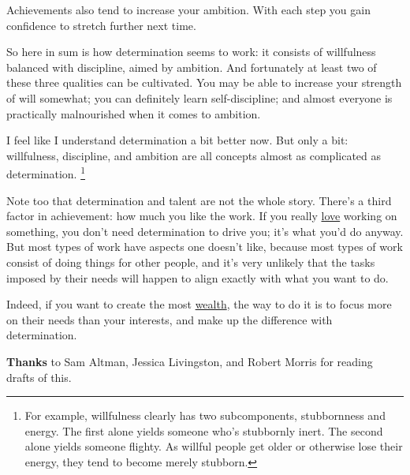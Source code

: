 Achievements also tend to increase your ambition. With each step you
gain confidence to stretch further next time.

So here in sum is how determination seems to work: it consists of
willfulness balanced with discipline, aimed by ambition. And fortunately
at least two of these three qualities can be cultivated. You may be able
to increase your strength of will somewhat; you can definitely learn
self-discipline; and almost everyone is practically malnourished when it
comes to ambition.

I feel like I understand determination a bit better now. But only a bit:
willfulness, discipline, and ambition are all concepts almost as
complicated as determination. \footnote{For example, willfulness clearly has two subcomponents,
stubbornness and energy. The first alone yields someone who's stubbornly
inert. The second alone yields someone flighty. As willful people get
older or otherwise lose their energy, they tend to become merely
stubborn.}

Note too that determination and talent are not the whole story. There's
a third factor in achievement: how much you like the work. If you really
\href{love.html}{love} working on something, you don't need
determination to drive you; it's what you'd do anyway. But most types of
work have aspects one doesn't like, because most types of work consist
of doing things for other people, and it's very unlikely that the tasks
imposed by their needs will happen to align exactly with what you want
to do.

Indeed, if you want to create the most \href{wealth.html}{wealth}, the
way to do it is to focus more on their needs than your interests, and
make up the difference with determination.


\textbf{Thanks} to Sam Altman, Jessica Livingston, and Robert Morris for
reading drafts of this.